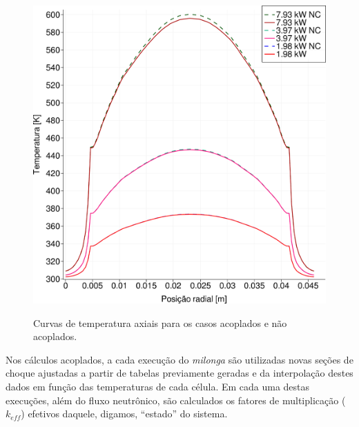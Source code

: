\begin{figure}[htb]
  \caption{Curvas de temperatura axiais para os casos acoplados e não acoplados.}
  \centering\includegraphics[scale=0.5]{figuras/T_x_all_square_port.png}
  \label{fig:T_all_x}
\end{figure}

Nos cálculos acoplados, a cada execução do \textit{milonga} são utilizadas
novas seções de choque ajustadas a partir de tabelas previamente geradas e da interpolação
destes dados em função das temperaturas de cada célula. Em cada uma destas
execuções, além do fluxo neutrônico, são calculados os fatores de multiplicação
($k_{eff}$) efetivos daquele, digamos, ``estado'' do sistema.


